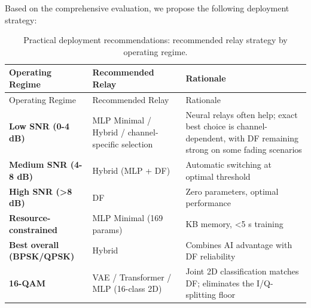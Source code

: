 Based on the comprehensive evaluation, we propose the following deployment strategy:

\begin{longtable}[]{@{}
  >{\raggedright\arraybackslash}p{}
  >{\raggedright\arraybackslash}p{}
  >{\raggedright\arraybackslash}p{}@{}}
\caption{Practical deployment recommendations: recommended relay strategy by operating regime.}\label{tbl:table32}\tabularnewline
\toprule\noalign{}
\begin{minipage}[b]{\linewidth}\raggedright
Operating Regime
\end{minipage} & \begin{minipage}[b]{\linewidth}\raggedright
Recommended Relay
\end{minipage} & \begin{minipage}[b]{\linewidth}\raggedright
Rationale
\end{minipage} \\
\midrule\noalign{}
\endfirsthead
\toprule\noalign{}
\begin{minipage}[b]{\linewidth}\raggedright
Operating Regime
\end{minipage} & \begin{minipage}[b]{\linewidth}\raggedright
Recommended Relay
\end{minipage} & \begin{minipage}[b]{\linewidth}\raggedright
Rationale
\end{minipage} \\
\midrule\noalign{}
\endhead
\bottomrule\noalign{}
\endlastfoot
\textbf{Low SNR (0-4 dB)} & MLP Minimal / Hybrid / channel-specific selection & Neural relays often help; exact best choice is channel-dependent, with DF remaining strong on some fading scenarios \\
\textbf{Medium SNR (4-8 dB)} & Hybrid (MLP + DF) & Automatic switching at optimal threshold \\
\textbf{High SNR (\textgreater8 dB)} & DF & Zero parameters, optimal performance \\
\textbf{Resource-constrained} & MLP Minimal (169 params) & 0.7 KB memory, \textless5 s training \\
\textbf{Best overall (BPSK/QPSK)} & Hybrid & Combines AI advantage with DF reliability \\
\textbf{16-QAM} & VAE / Transformer / MLP (16-class 2D) & Joint 2D classification matches DF; eliminates the I/Q-splitting floor \\
\end{longtable}

